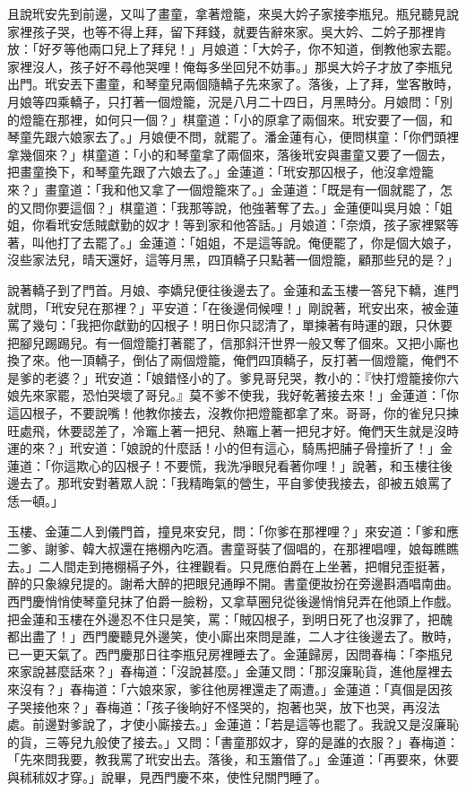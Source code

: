 且說玳安先到前邊，又叫了畫童，拿著燈籠，來吳大妗子家接李瓶兒。瓶兒聽見說家裡孩子哭，也等不得上拜，留下拜錢，就要告辭來家。吳大妗、二妗子那裡肯放：「好歹等他兩口兒上了拜兒！」月娘道：「大妗子，你不知道，倒教他家去罷。家裡沒人，孩子好不尋他哭哩！俺每多坐回兒不妨事。」那吳大妗子才放了李瓶兒出門。玳安丟下畫童，和琴童兒兩個隨轎子先來家了。落後，上了拜，堂客散時，月娘等四乘轎子，只打著一個燈籠，況是八月二十四日，月黑時分。月娘問：「別的燈籠在那裡，如何只一個？」棋童道：「小的原拿了兩個來。玳安要了一個，和琴童先跟六娘家去了。」月娘便不問，就罷了。潘金蓮有心，便問棋童：「你們頭裡拿幾個來？」棋童道：「小的和琴童拿了兩個來，落後玳安與畫童又要了一個去，把畫童換下，和琴童先跟了六娘去了。」金蓮道：「玳安那囚根子，他沒拿燈籠來？」畫童道：「我和他又拿了一個燈籠來了。」金蓮道：「既是有一個就罷了，怎的又問你要這個？」棋童道：「我那等說，他強著奪了去。」金蓮便叫吳月娘：「姐姐，你看玳安恁賊獻勤的奴才！等到家和他答話。」月娘道：「奈煩，孩子家裡緊等著，叫他打了去罷了。」金蓮道：「姐姐，不是這等說。俺便罷了，你是個大娘子，沒些家法兒，晴天還好，這等月黑，四頂轎子只點著一個燈籠，顧那些兒的是？」

說著轎子到了門首。月娘、李嬌兒便往後邊去了。金蓮和孟玉樓一答兒下轎，進門就問，「玳安兒在那裡？」平安道：「在後邊伺候哩！」剛說著，玳安出來，被金蓮罵了幾句：「我把你獻勤的囚根子！明日你只認清了，單揀著有時運的跟，只休要把腳兒踢踢兒。有一個燈籠打著罷了，信那斜汗世界一般又奪了個來。又把小廝也換了來。他一頂轎子，倒佔了兩個燈籠，俺們四頂轎子，反打著一個燈籠，俺們不是爹的老婆？」玳安道：「娘錯怪小的了。爹見哥兒哭，教小的：『快打燈籠接你六娘先來家罷，恐怕哭壞了哥兒。』莫不爹不使我，我好乾著接去來！」金蓮道：「你這囚根子，不要說嘴！他教你接去，沒教你把燈籠都拿了來。哥哥，你的雀兒只揀旺處飛，休要認差了，冷竈上著一把兒、熱竈上著一把兒才好。俺們天生就是沒時運的來？」玳安道：「娘說的什麼話！小的但有這心，騎馬把脯子骨撞折了！」金蓮道：「你這欺心的囚根子！不要慌，我洗凈眼兒看著你哩！」說著，和玉樓往後邊去了。那玳安對著眾人說：「我精晦氣的營生，平自爹使我接去，卻被五娘罵了恁一頓。」

玉樓、金蓮二人到儀門首，撞見來安兒，問：「你爹在那裡哩？」來安道：「爹和應二爹、謝爹、韓大叔還在捲棚內吃酒。書童哥裝了個唱的，在那裡唱哩，娘每瞧瞧去。」二人間走到捲棚槅子外，往裡觀看。只見應伯爵在上坐著，把帽兒歪挺著，醉的只象線兒提的。謝希大醉的把眼兒通睜不開。書童便妝扮在旁邊斟酒唱南曲。西門慶悄悄使琴童兒抹了伯爵一臉粉，又拿草圈兒從後邊悄悄兒弄在他頭上作戲。把金蓮和玉樓在外邊忍不住只是笑，罵：「賊囚根子，到明日死了也沒罪了，把醜都出盡了！」西門慶聽見外邊笑，使小廝出來問是誰，二人才往後邊去了。散時，已一更天氣了。西門慶那日往李瓶兒房裡睡去了。金蓮歸房，因問春梅：「李瓶兒來家說甚麼話來？」春梅道：「沒說甚麼。」金蓮又問：「那沒廉恥貨，進他屋裡去來沒有？」春梅道：「六娘來家，爹往他房裡還走了兩遭。」金蓮道：「真個是因孩子哭接他來？」春梅道：「孩子後晌好不怪哭的，抱著也哭，放下也哭，再沒法處。前邊對爹說了，才使小廝接去。」金蓮道：「若是這等也罷了。我說又是沒廉恥的貨，三等兒九般使了接去。」又問：「書童那奴才，穿的是誰的衣服？」春梅道：「先來問我要，教我罵了玳安出去。落後，和玉簫借了。」金蓮道：「再要來，休要與秫秫奴才穿。」說畢，見西門慶不來，使性兒關門睡了。

